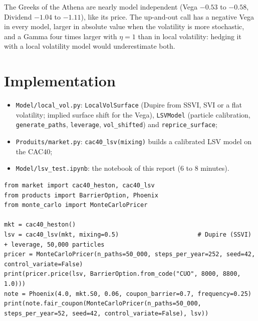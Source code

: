 \documentclass[11pt,a4paper]{article}
\newcommand{\code}[1]{\texttt{#1}}
\begin{document}
The Greeks of the Athena are nearly model independent (Vega $-0.53$ to $-0.58$, Dividend $-1.04$ to $-1.11$), like its
price. The up-and-out call has a negative Vega in every model, larger in absolute value when the volatility is more
stochastic, and a Gamma four times larger with $\eta = 1$ than in local volatility: hedging it with a local
volatility model would underestimate both.

\section{Implementation}\label{sec:implementation}
\begin{itemize}
\item \code{Model/local\_vol.py}: \code{LocalVolSurface} (Dupire from SSVI, SVI or a flat volatility; implied surface
shift for the Vega), \code{LSVModel} (particle calibration, \code{generate\_paths}, \code{leverage},
\code{vol\_shifted}) and \code{reprice\_surface};
\item \code{Produits/market.py}: \code{cac40\_lsv(mixing)} builds a calibrated LSV model on the CAC40;
\item \code{Model/lsv\_test.ipynb}: the notebook of this report (6 to 8 minutes).
\end{itemize}

\begin{lstlisting}
from market import cac40_heston, cac40_lsv
from products import BarrierOption, Phoenix
from monte_carlo import MonteCarloPricer

mkt = cac40_heston()
lsv = cac40_lsv(mkt, mixing=0.5)                      # Dupire (SSVI) + leverage, 50,000 particles
pricer = MonteCarloPricer(n_paths=50_000, steps_per_year=252, seed=42, control_variate=False)
print(pricer.price(lsv, BarrierOption.from_code("CUO", 8000, 8800, 1.0)))
note = Phoenix(4.0, mkt.S0, 0.06, coupon_barrier=0.7, frequency=0.25)
print(note.fair_coupon(MonteCarloPricer(n_paths=50_000, steps_per_year=52, seed=42, control_variate=False), lsv))
\end{lstlisting}

\end{document}
